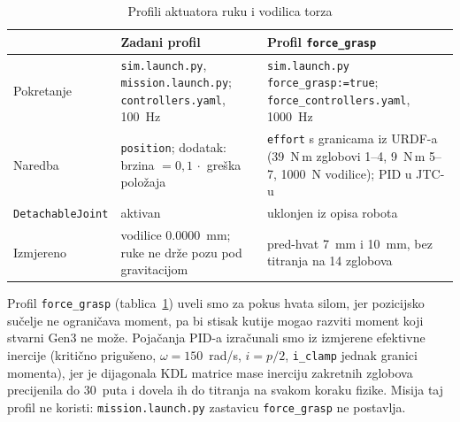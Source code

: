\begin{table}[H]
  \centering
  \scriptsize
  \caption{Profili aktuatora ruku i vodilica torza}
  \label{tab:profili-aktuatora}
  \begin{tabularx}{\textwidth}{@{}>{\raggedright\arraybackslash}p{2.4cm}>{\raggedright\arraybackslash}X>{\raggedright\arraybackslash}X@{}}
    \toprule
    & \textbf{Zadani profil} & \textbf{Profil \texttt{force\_grasp}} \\
    \midrule
    Pokretanje & \texttt{sim.launch.py}, \texttt{mission.launch.py}; \texttt{controllers.yaml}, 100~Hz & \texttt{sim.launch.py force\_grasp:=true}; \texttt{force\_controllers.yaml}, 1000~Hz \\
    Naredba & \texttt{position}; dodatak: brzina $= 0{,}1\,\cdot$ greška položaja & \texttt{effort} s granicama iz URDF-a (39~N\,m zglobovi 1--4, 9~N\,m 5--7, 1000~N vodilice); PID u JTC-u \\
    \texttt{DetachableJoint} & aktivan & uklonjen iz opisa robota \\
    Izmjereno & vodilice \SI{0.0000}{mm}; ruke ne drže pozu pod gravitacijom & pred-hvat \SI{7}{mm} i \SI{10}{mm}, bez titranja na 14 zglobova \\
    \bottomrule
  \end{tabularx}
\end{table}

Profil \texttt{force\_grasp} (tablica~\ref{tab:profili-aktuatora}) uveli smo za pokus hvata
silom, jer pozicijsko sučelje ne ograničava moment, pa bi stisak kutije mogao razviti moment
koji stvarni Gen3 ne može. Pojačanja PID-a izračunali smo iz izmjerene efektivne inercije
(kritično prigušeno, $\omega = 150$~rad/s, $i = p/2$, \texttt{i\_clamp} jednak granici momenta),
jer je dijagonala KDL matrice mase inerciju zakretnih zglobova precijenila do 30~puta i dovela
ih do titranja na svakom koraku fizike. Misija taj profil ne koristi:
\texttt{mission.launch.py} zastavicu \texttt{force\_grasp} ne postavlja.
